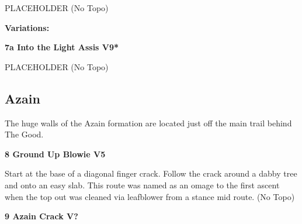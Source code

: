 \begin{multicols}{2}
\begin{minipage}{\linewidth}
					\begin{adjustwidth}{0.5cm}{}				
					PLACEHOLDER
						\newline (No Topo) 
					\end{adjustwidth}
					\end{minipage}
						\begin{adjustwidth}{0.5cm}{}				
						\textbf{Variations:} \newline
							\begin{minipage}{\linewidth}	
							\label{vr:Into the Light Assis}
\colorbox{Goldenrod!50}{
\parbox{0.95\textwidth}{
\textbf{
7a Into the Light Assis V9*  
}
}
}

							\begin{adjustwidth}{0.5cm}{}				
							PLACEHOLDER
								\newline (No Topo) 
							\end{adjustwidth}
							\end{minipage}
						\end{adjustwidth}
			\begin{minipage}{\columnwidth}
			\subsection*{Azain}\label{bf:Azain}
			The huge walls of the Azain formation are located just off the main trail behind The Good.
			
\label{pt:Ground up Blowie}
			\end{minipage}
			
					\begin{minipage}{\linewidth}	
					\label{rt:Ground Up Blowie}
\colorbox{RoyalBlue!20}{
\parbox{0.95\textwidth}{
\textbf{
8 Ground Up Blowie V5    
}
}
}

					\begin{adjustwidth}{0.5cm}{}				
					Start at the base of a diagonal finger crack. Follow the crack around a dabby tree and onto an easy slab. This route was named as an omage to the first ascent when the top out was cleaned via leafblower from a stance mid route.
						\newline (No Topo) 
					\end{adjustwidth}
					\end{minipage}
					\begin{minipage}{\linewidth}	
					\label{rt:Azain Crack}
\colorbox{black!20}{
\parbox{0.95\textwidth}{
\textbf{
9 Azain Crack V?  
}
}
}


\end{minipage}
\end{multicols}
